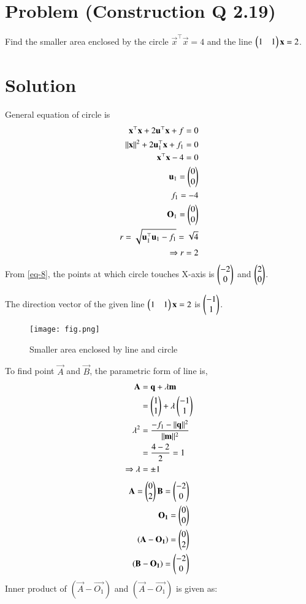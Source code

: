 \documentclass[journal,12pt,twocolumn]{IEEEtran}
\begin{document}
\section*{\textbf{Problem (Construction Q 2.19)}}
Find the smaller area enclosed by the circle $\vec{x}^\top\vec{x}=4$ and the line $\begin{pmatrix}1 & 1\end{pmatrix}\mathbf{x}=2$.
\section*{\textbf{Solution}}
General equation of circle is
\begin{align}
    \mathbf{x}^\top\mathbf{x}+2\mathbf{u}^\top\mathbf{x}+f=0 \\
    \lVert\mathbf{x}\rVert^2+2\mathbf{u}_1^\top\mathbf{x}+f_1=0 \\
    \mathbf{x}^\top\mathbf{x} - 4 = 0 \\
    \mathbf{u}_1=\begin{pmatrix}0\\0\end{pmatrix} \\
    f_1 = -4 \\
    \mathbf{O}_1 = \begin{pmatrix}0\\0\end{pmatrix} \\
    r = \sqrt{\mathbf{u}_1^\top\mathbf{u}_1 - f_1} = \sqrt{4} \\
    \Rightarrow r = 2 \label{eq-8}
\end{align}
From \eqref{eq-8}, the points at which circle touches X-axis is $\begin{pmatrix}-2\\0\end{pmatrix}$ and $\begin{pmatrix}2\\0\end{pmatrix}$.

The direction vector of the given line $\begin{pmatrix}1 & 1\end{pmatrix}\mathbf{x}=2$ is $\begin{pmatrix}-1\\1\end{pmatrix}$.

\begin{figure}[!h]
\centering
\texttt{[image: fig.png]}
\caption{Smaller area enclosed by line and circle}
\end{figure}

To find point $\vec{A}$ and $\vec{B}$, the parametric form of line is,
\begin{align}
    \mathbf{A}&=\mathbf{q}+\lambda\mathbf{m} \\
    &= \begin{pmatrix}1\\1\end{pmatrix}+\lambda\begin{pmatrix}-1\\1\end{pmatrix} \\
    \lambda^2 &= \frac{-f_1-\lVert\mathbf{q}\rVert^2}{\lVert\mathbf{m}\rVert^2} \\
    &= \frac{4-2}{2} = 1 \\
    \Rightarrow \lambda &= \pm 1
\end{align}
\begin{align}
    \mathbf{A} = \begin{pmatrix}0\\2\end{pmatrix} \mathbf{B} = \begin{pmatrix}-2\\0\end{pmatrix} \\
    \mathbf{O_1} = \begin{pmatrix}0\\0\end{pmatrix} \\
    (\mathbf{A} - \mathbf{O_1}) = \begin{pmatrix}0\\2\end{pmatrix} \\
    (\mathbf{B} - \mathbf{O_1}) = \begin{pmatrix}-2\\0\end{pmatrix}
\end{align}
Inner product of $(\vec{A} - \vec{O_1})$ and $(\vec{A} - \vec{O_1})$ is given as: \\
\end{document}
